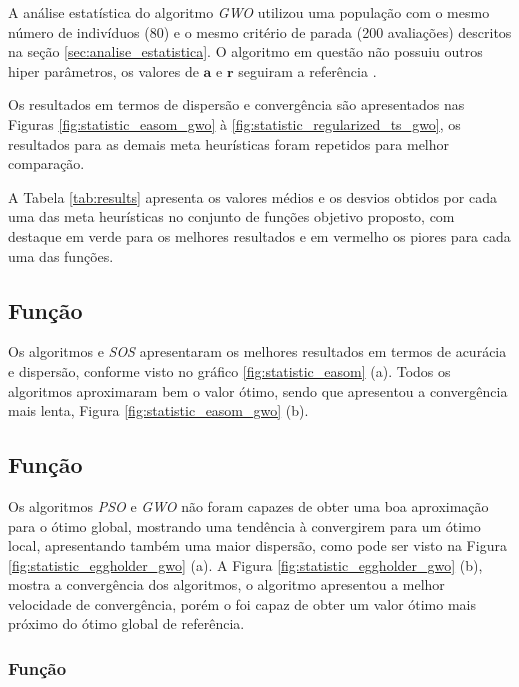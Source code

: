 \documentclass[a4paper, 11pt]{article}
\begin{document}
A análise estatística do algoritmo \textit{GWO} utilizou uma população com o mesmo número de indivíduos (80) e o mesmo critério de parada (200 avaliações) descritos na seção \ref{sec:analise_estatistica}. O algoritmo em questão não possuiu outros hiper parâmetros, os valores de \( \mathbf{a} \) e \( \mathbf{r}\) seguiram a referência \cite{Mirjalili2014}. 

Os resultados em termos de dispersão e convergência são apresentados nas Figuras \ref{fig:statistic_easom_gwo} à \ref{fig:statistic_regularized_ts_gwo}, os resultados para as demais meta heurísticas foram repetidos para melhor comparação. 

A Tabela \ref{tab:results} apresenta os valores médios e os desvios obtidos por cada uma das meta heurísticas no conjunto de funções objetivo proposto, com destaque em verde para os melhores resultados e em vermelho os piores para cada uma das funções.

\subsection{Função }

Os algoritmos  e \textit{SOS} apresentaram os melhores resultados em termos de acurácia e dispersão, conforme visto no gráfico \ref{fig:statistic_easom} (a). Todos os algoritmos aproximaram bem o valor ótimo, sendo que  apresentou a convergência mais lenta, Figura \ref{fig:statistic_easom_gwo} (b).

\subsection{Função }

Os algoritmos \textit{PSO} e \textit{GWO} não foram capazes de obter uma boa aproximação para o ótimo global, mostrando uma tendência à convergirem para um ótimo local, apresentando também uma maior dispersão, como pode ser visto na Figura \ref{fig:statistic_eggholder_gwo} (a). A Figura \ref{fig:statistic_eggholder_gwo} (b), mostra a convergência dos algoritmos, o algoritmo  apresentou a melhor velocidade de convergência, porém o  foi capaz de obter um valor ótimo mais próximo do ótimo global de referência.

\subsubsection{Função }
\end{document}
